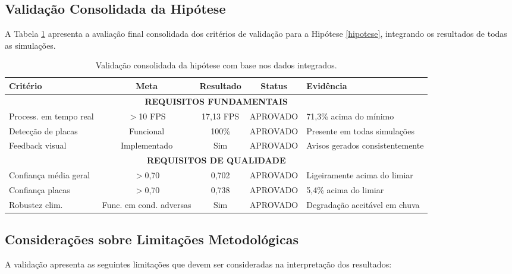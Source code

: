 \subsection{Validação Consolidada da Hipótese} \label{subsec:validacao_hipotese}

A Tabela \ref{tab:validacao_consolidada} apresenta a avaliação final consolidada dos critérios de validação para a Hipótese \ref{hipotese}, integrando os resultados de todas as simulações.

\begin{table}[H]
\centering
\renewcommand{\arraystretch}{1.3}
\begin{tabularx}{\textwidth}{|X|c|c|c|X|}
\hline
\textbf{Critério} & \textbf{Meta} & \textbf{Resultado} & \textbf{Status} & \textbf{Evidência} \\
\hline
\multicolumn{5}{|c|}{\textbf{REQUISITOS FUNDAMENTAIS}} \\
\hline
Process. em tempo real & $>$10 FPS & 17,13 FPS & \cellcolor{green!25}APROVADO & 71,3\% acima do mínimo \\
\hline
Detecção de placas & Funcional & 100\% & \cellcolor{green!25}APROVADO & Presente em todas simulações \\
\hline
Feedback visual & Implementado & Sim & \cellcolor{green!25}APROVADO & Avisos gerados consistentemente \\
\hline
\multicolumn{5}{|c|}{\textbf{REQUISITOS DE QUALIDADE}} \\
\hline
Confiança média geral & $>$0,70 & 0,702 & \cellcolor{green!25}APROVADO & Ligeiramente acima do limiar \\
\hline
Confiança placas & $>$0,70 & 0,738 & \cellcolor{green!25}APROVADO & 5,4\% acima do limiar \\
\hline
Robustez clim. & Func. em cond. adversas & Sim & \cellcolor{green!25}APROVADO & Degradação aceitável em chuva \\
\hline
\end{tabularx}
\caption{Validação consolidada da hipótese com base nos dados integrados.}
\label{tab:validacao_consolidada}
\end{table}

\subsection{Considerações sobre Limitações Metodológicas} \label{subsec:limitacoes_metodo}

A validação apresenta as seguintes limitações que devem ser consideradas na interpretação dos resultados:

